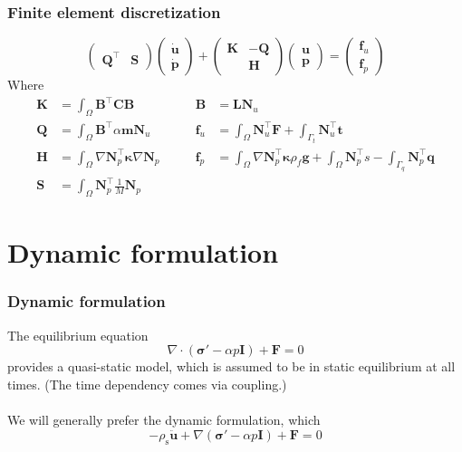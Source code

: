 \documentclass{beamer}
\begin{document}
\begin{frame}
  \frametitle{Finite element discretization}

  \[
    \begin{pmatrix} & \\ \bm{Q}^\intercal & \bm{S} \end{pmatrix}
    \begin{pmatrix} \dot{\bm{u}} \\ \dot{\bm{p}} \end{pmatrix} +
    \begin{pmatrix} \bm{K} & -\bm{Q} \\ & \bm{H} \end{pmatrix}
    \begin{pmatrix} \bm{u} \\ \bm{p} \end{pmatrix} =
    \begin{pmatrix} \bm{f}_u \\ \bm{f}_p \end{pmatrix}
  \]
  Where
  \begin{align*}
    \bm{K} &= \int_\Omega \bm{B}^\intercal \bm{CB} \qquad
             & \bm{B} &= \bm{L} \bm{N}_u \\
    \bm{Q} &= \int_\Omega \bm{B}^\intercal \alpha \bm{m} \bm{N}_u \qquad
             & \bm{f}_u &= \int_\Omega \bm{N}_u^\intercal \bm{F}
                          + \int_{\Gamma_t} \bm{N}_u^\intercal \bm{t} \\
    \bm{H} &= \int_\Omega \nabla \bm{N}_p^\intercal \bm{\kappa} \nabla \bm{N}_p \qquad
             & \bm{f}_p &= \int_\Omega \nabla \bm{N}_p^\intercal \bm{\kappa} \rho_f \bm{g}
                          + \int_\Omega \bm{N}_p^\intercal s
                          - \int_{\Gamma_q} \bm{N}_p^\intercal \bm{q} \\
    \bm{S} &= \int_\Omega \bm{N}_p^\intercal \frac{1}{M} \bm{N}_p
  \end{align*}
\end{frame}

\section{Dynamic formulation}

\begin{frame}
  \frametitle{Dynamic formulation}

  The equilibrium equation
  \[
    \nabla \cdot \left(\bm{\sigma}' - \alpha p \bm{I} \right) + \bm{F} = 0
  \]
  provides a quasi-static model, which is assumed to be in static equilibrium at
  all times. (The time dependency comes via coupling.) \\~\\

  We will generally prefer the dynamic formulation, which
  \[
    - \rho_\text{s} \ddot{\bm u} +  \nabla \left(\bm{\sigma}' - \alpha p \bm{I} \right) + \bm{F} = 0
  \]
\end{frame}
\end{document}
